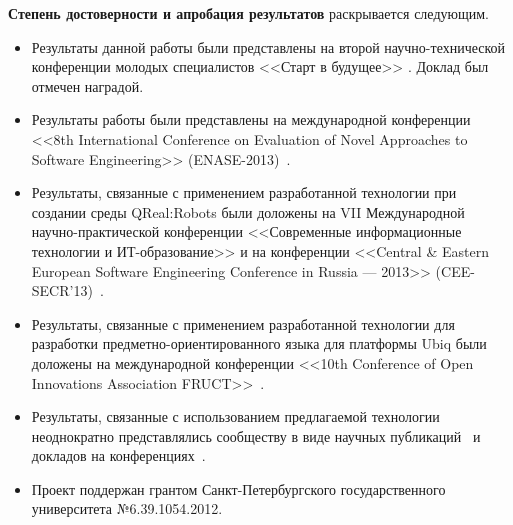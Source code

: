 \textbf{Степень достоверности и апробация результатов} раскрывается следующим.
\begin{itemize}
	\item Результаты данной работы были представлены на второй 
		научно-технической конференции молодых специалистов <<Старт в будущее>> 
		\cite{kuzenkova2011metamodeling}. Доклад был отмечен наградой.
	\item Результаты работы были представлены на международной конференции 
		<<8th International Conference on Evaluation of Novel Approaches to Software Engineering>> 
		(ENASE-2013)~.
	\item Результаты, связанные с применением разработанной технологии при 
		создании среды QReal:Robots были доложены на VII Международной 
		научно-практической конференции <<Современные информационные технологии 
		и ИТ-образование>> \cite{litvinov2012robots} и на конференции 
		<<Central \& Eastern European Software Engineering Conference in Russia --- 2013>> 
		(CEE-SECR'13)~\cite{terekhov2013secr}.
	\item Результаты, связанные с применением разработанной технологии для 
		разработки предметно-ориентированного языка для платформы Ubiq были доложены 
		на международной конференции <<10th Conference of Open Innovations 
		Association FRUCT>>~\cite{bryksin2011ubiq}.
	\item Результаты, связанные с использованием предлагаемой технологии неоднократно 
		представлялись сообществу в виде научных публикаций~\cite{kuzenkova2011qreal, litvinov2013robots,
		terekhov2013qreal, osechkina2010gestures, terekhov2009architecture}
		и докладов на конференциях~\cite{terekhov2013robots, kuzenkova2013refactoring,
		osechkina2012multistroke, bryksin2011qreal, kuzenkova2011metamodeling, bryksin2011robots}.
	\item Проект поддержан грантом Санкт-Петербургского государственного университета №6.39.1054.2012.
\end{itemize}

